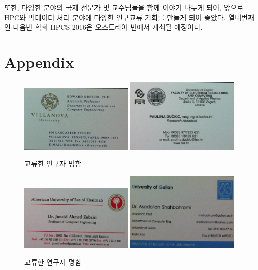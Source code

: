 \documentclass[twocolumn]{article}
\begin{document}
또한, 다양한 분야의 국제 전문가 및 교수님들을 함께 이야기 나누게 되어, 앞으로 HPC와 빅데이터 처리 분야에 다양한 연구교류 기회를 만들게 되어 좋았다. 열네번째인 다음번 학회 HPCS 2016은 오스트리아 빈에서 개최될 예정이다.




\section*{Appendix}
\begin{figure}[htb]
        \centering
        \includegraphics[width=0.48\textwidth]{nc04.png}
        \includegraphics[width=0.48\textwidth]{nc05.png}
        \caption{교류한 연구자 명함}
        \label{fig:namecards02}
\end{figure}

\begin{figure}[htb]
        \centering
        \includegraphics[width=0.48\textwidth]{nc06.png}
        \includegraphics[width=0.48\textwidth]{nc07.png}
        \caption{교류한 연구자 명함}
        \label{fig:namecards03}
\end{figure}
\end{document}
